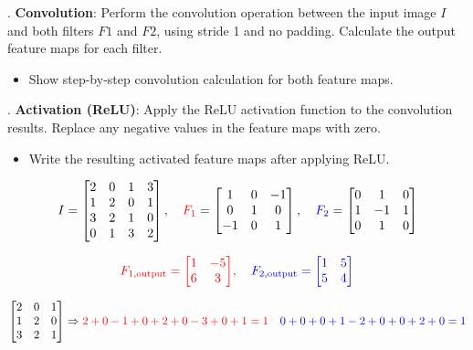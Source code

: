 \documentclass[a4 paper]{article}
\begin{document}

. \textbf{Convolution}: Perform the convolution operation between the input image $I$ and both filters $F1$ and $F2$, using stride 1 and no padding. Calculate the output feature maps for each filter.
    \begin{itemize}
        \item Show step-by-step convolution calculation for both feature maps.
    \end{itemize}

. \textbf{Activation (ReLU)}: Apply the ReLU activation function to the convolution results. Replace any negative values in the feature maps with zero.
    \begin{itemize}
        \item Write the resulting activated feature maps after applying ReLU.
    \end{itemize}


\[
I =
\begin{bmatrix}
2 & 0 & 1 & 3 \\
1 & 2 & 0 & 1 \\
3 & 2 & 1 & 0 \\
0 & 1 & 3 & 2
\end{bmatrix},
\quad
\textcolor{red}{F_1} =
\begin{bmatrix}
1 & 0 & -1 \\
0 & 1 & 0 \\
-1 & 0 & 1
\end{bmatrix},
\quad
\textcolor{blue}{F_2} =
\begin{bmatrix}
0 & 1 & 0 \\
1 & -1 & 1 \\
0 & 1 & 0
\end{bmatrix}
\]

\[
\color{red}{F_{1,\text{output}} =
\begin{bmatrix}
1 & -5 \\
6 & 3
\end{bmatrix}},
\quad
\color{blue}{F_{2,\text{output}} =
\begin{bmatrix}
1 & 5 \\
5 & 4
\end{bmatrix}}
\]

\[
\begin{bmatrix}
2 & 0 & 1 \\
1 & 2 & 0 \\
3 & 2 & 1
\end{bmatrix}
\Rightarrow
\color{red}{2+0-1+0+2+0-3+0+1=1}
\quad
\color{blue}{0+0+0+1-2+0+0+2+0=1}
\]
\end{document}
